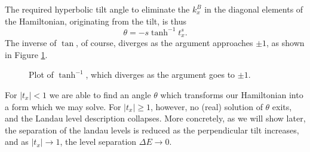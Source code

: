 The required hyperbolic tilt angle to eliminate the \(k^B_{x}\) in the diagonal elements of the Hamiltonian, originating from the tilt, is thus
\begin{equation}
  \label{eq:38}
  \theta = - s \tanh^{-1} t^s_{x}.
\end{equation}
The inverse of \(\tan \), of course, diverges as the argument approaches \(\pm 1\), as shown in Figure \ref{fig:arctanh}.
\begin{figure}[ht]
  \centering
  \caption{\label{fig:arctanh} Plot of \(\tanh^{-1}\), which diverges as the argument goes to \(\pm 1\).}
\end{figure}
For \(|t_{x}| < 1\) we are able to find an angle \(\theta \) which transforms our Hamiltonian into a form which we may solve.
For \(|t_{x}| \geq 1\), however, no (real) solution of \(\theta \) exits, and the Landau level description collapses.
More concretely, as we will show later, the separation of the landau levels is reduced as the perpendicular tilt increases, and as \( |t_x| \to 1 \), the level separation \( \Delta E \to 0 \).



